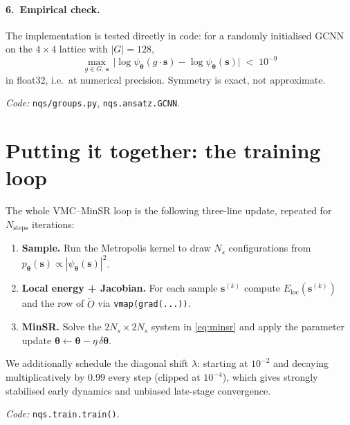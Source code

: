 \documentclass[11pt,a4paper]{article}
\newcommand{\bs}{\bm{s}}
\newcommand{\btheta}{\bm{\theta}}
\newcommand{\psip}{\psi_{\btheta}}
\newcommand{\Eloc}{E_{\mathrm{loc}}}
\theoremstyle{definition}
\theoremstyle{plain}
\begin{document}
\paragraph{6.\ Empirical check.}
The implementation is tested directly in code: for a randomly initialised
GCNN on the $4\times 4$ lattice with $|G| = 128$,
\begin{equation*}
\max_{g\in G,\,\bs}\,\bigl|\log\psip(g\cdot\bs) - \log\psip(\bs)\bigr| \;<\; 10^{-9}
\end{equation*}
in float32, i.e.\ at numerical precision. Symmetry is exact, not approximate.

\smallskip
\noindent\textit{Code:} \texttt{nqs/groups.py}, \texttt{nqs.ansatz.GCNN}.

\section{Putting it together: the training loop}

The whole VMC--MinSR loop is the following three-line update, repeated for
$N_{\text{steps}}$ iterations:
\begin{enumerate}
   \item \textbf{Sample.} Run the Metropolis kernel to draw $N_{s}$
         configurations from $p_{\btheta}(\bs)\propto |\psip(\bs)|^{2}$.
   \item \textbf{Local energy + Jacobian.} For each sample $\bs^{(k)}$
         compute $\Eloc(\bs^{(k)})$ and the row of $\widetilde O$ via
         \texttt{vmap(grad(...))}.
   \item \textbf{MinSR.} Solve the $2N_{s}\times 2N_{s}$ system in
         \eqref{eq:minsr} and apply the parameter update
         $\btheta \leftarrow \btheta - \eta\,\delta\btheta$.
\end{enumerate}
We additionally schedule the diagonal shift $\lambda$: starting at $10^{-2}$
and decaying multiplicatively by 0.99 every step (clipped at $10^{-4}$),
which gives strongly stabilised early dynamics and unbiased late-stage
convergence.

\smallskip
\noindent\textit{Code:} \texttt{nqs.train.train()}.
\end{document}
